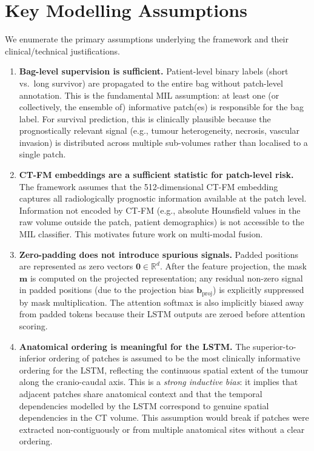 \documentclass[11pt,a4paper]{article}
\begin{document}
\section{Key Modelling Assumptions}
\label{sec:assumptions}

We enumerate the primary assumptions underlying the framework and their
clinical/technical justifications.

\begin{enumerate}

  \item \textbf{Bag-level supervision is sufficient.}
        Patient-level binary labels (short vs.\ long survivor) are propagated to the
        entire bag without patch-level annotation. This is the fundamental MIL
        assumption: at least one (or collectively, the ensemble of) informative
        patch(es) is responsible for the bag label. For survival prediction, this is
        clinically plausible because the prognostically relevant signal (e.g., tumour
        heterogeneity, necrosis, vascular invasion) is distributed across multiple
        sub-volumes rather than localised to a single patch.

  \item \textbf{CT-FM embeddings are a sufficient statistic for patch-level risk.}
        The framework assumes that the 512-dimensional CT-FM embedding captures all
        radiologically prognostic information available at the patch level.
        Information not encoded by CT-FM (e.g., absolute Hounsfield values in the
        raw volume outside the patch, patient demographics) is not accessible to the
        MIL classifier. This motivates future work on multi-modal fusion.

  \item \textbf{Zero-padding does not introduce spurious signals.}
        Padded positions are represented as zero vectors $\mathbf{0} \in \mathbb{R}^d$.
        After the feature projection, the mask $\mathbf{m}$ is computed on the
        projected representation; any residual non-zero signal in padded positions
        (due to the projection bias $\mathbf{b}_{\text{proj}}$) is explicitly
        suppressed by mask multiplication. The attention softmax is also
        implicitly biased away from padded tokens because their LSTM outputs are
        zeroed before attention scoring.

  \item \textbf{Anatomical ordering is meaningful for the LSTM.}
        The superior-to-inferior ordering of patches is assumed to be the most
        clinically informative ordering for the LSTM, reflecting the continuous
        spatial extent of the tumour along the cranio-caudal axis. This is a
        \emph{strong inductive bias}: it implies that adjacent patches share
        anatomical context and that the temporal dependencies modelled by the
        LSTM correspond to genuine spatial dependencies in the CT volume.
        This assumption would break if patches were extracted non-contiguously or
        from multiple anatomical sites without a clear ordering.


\end{enumerate}
\end{document}
